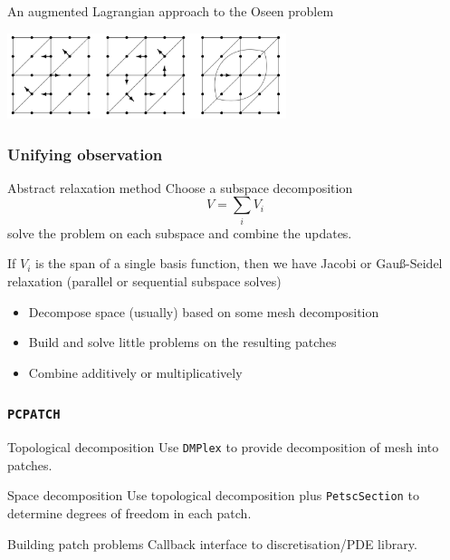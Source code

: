 \documentclass[presentation,aspectratio=43,10pt]{beamer}
\begin{document}
\begin{frame}
\begin{onlyenv}
\begin{block}{An augmented Lagrangian approach to the Oseen problem}
      \begin{center}
        \includegraphics[height=2.5cm]{benzi}
      \end{center}
      \begin{flushright}
        \textcite{Benzi:2006} \hspace{4em}
      \end{flushright}
    \end{block}
  \end{onlyenv}
\end{frame}

\begin{frame}
  \frametitle{Unifying observation}

  \begin{block}{Abstract relaxation method}
    Choose a subspace decomposition
    \begin{equation*}
      V = \sum_i V_i
    \end{equation*}
    solve the problem on each subspace and combine the updates.
  \end{block}
  \begin{example}
    If $V_i$ is the span of a single basis function, then we have
    Jacobi or Gau\ss-Seidel relaxation (parallel or sequential
    subspace solves)
  \end{example}
  \begin{itemize}
  \item Decompose space (usually) based on some mesh decomposition
  \item Build and solve little problems on the resulting patches
  \item Combine additively or multiplicatively
  \end{itemize}
\end{frame}

\begin{frame}
  \frametitle{\texttt{PCPATCH}}
  \begin{block}{Topological decomposition}
    Use \texttt{DMPlex} to provide decomposition of mesh into patches.
  \end{block}

  \begin{block}{Space decomposition}
    Use topological decomposition plus \texttt{PetscSection} to
    determine degrees of freedom in each patch.
  \end{block}

  \begin{block}{Building patch problems}
    Callback interface to discretisation/PDE library.
  \end{block}
\end{frame}
\end{document}
